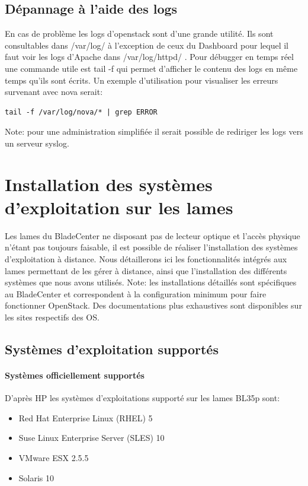 \documentclass[a4paper,oneside]{report}
\begin{document}
\section{Dépannage à l'aide des logs}
En cas de problème les logs d'\gls{openstack} sont d'une grande utilité. Ils sont consultables dans /var/log/ à l'exception de ceux du Dashboard pour lequel il faut voir les logs d'Apache dans /var/log/httpd/ .
Pour débugger en temps réel une commande utile est tail -f qui permet d'afficher le contenu des logs en même temps qu'ils sont écrits.
Un exemple d'utilisation pour visualiser les erreurs survenant avec nova serait:
\begin{verbatim}
tail -f /var/log/nova/* | grep ERROR
\end{verbatim}

\noindent Note: pour une administration simplifiée il serait possible de rediriger les logs vers un serveur syslog.


\chapter{Installation des systèmes d'exploitation sur les lames} \label{sec:installos}
Les lames du BladeCenter ne disposant pas de lecteur optique et l'accès physique n'étant pas toujours faisable, il est possible de réaliser l'installation des systèmes d'exploitation à distance.
Nous détaillerons ici les fonctionnalités intégrés aux lames permettant de les gérer à distance, ainsi que l'installation des différents systèmes que nous avons utilisés.\newline
Note: les installations détaillés sont spécifiques au BladeCenter et correspondent à la configuration minimum pour faire fonctionner OpenStack. Des documentations plus exhaustives sont disponibles sur les sites respectifs des OS.

\section{Systèmes d'exploitation supportés} \label{sec:compatse}
\subsubsection{Systèmes officiellement supportés}
D'après HP les systèmes d'exploitations supporté sur les lames BL35p sont:
\begin{itemize}
\item Red Hat Enterprise Linux (RHEL) 5
\item Suse Linux Enterprise Server (SLES) 10
\item VMware ESX 2.5.5
\item Solaris 10
\end{itemize}
\end{document}
